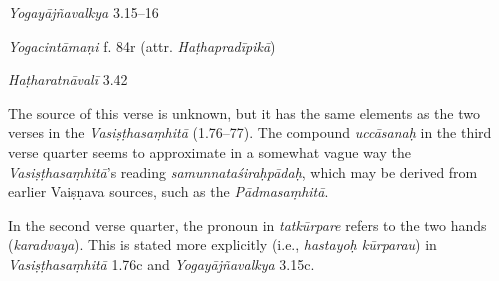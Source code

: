 \begin{ekdosis}
\begin{sources}[hp01_030]
\emph{Yogayājñavalkya} 3.15–16

\begin{versinnote}
\end{versinnote}

\end{sources}

\begin{testimonia}[hp01_030]
\emph{Yogacintāmaṇi} f. 84r (attr. \emph{Haṭhapradīpikā})

\begin{versinnote}
\end{versinnote}

\emph{Haṭharatnāvalī} 3.42

\begin{versinnote}
\end{versinnote}

\end{testimonia}

\begin{philcomm}[hp01_030]
The source of this verse is unknown, but it has the same elements as the two verses in the \emph{Vasiṣṭhasaṃhitā} (1.76–77). The compound \emph{uccāsanaḥ} in the third verse quarter seems to approximate in a somewhat vague way the \emph{Vasiṣṭhasaṃhitā}’s reading \emph{samunnataśiraḥpādaḥ}, which may be derived from earlier Vaiṣṇava sources, such as the \textit{Pādmasaṃhitā}. 
 
In the second verse quarter, the pronoun in \emph{tatkūrpare} refers to the two hands (\emph{karadvaya}). This is stated more explicitly (i.e., \emph{hastayoḥ kūrparau}) in \emph{Vasiṣṭhasaṃhitā} 1.76c and \emph{Yogayājñavalkya} 3.15c.
\end{philcomm}


\end{ekdosis}
